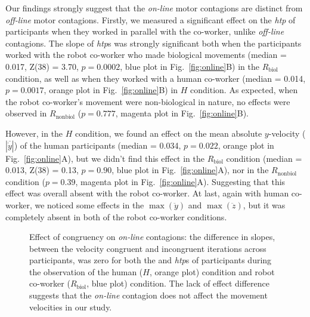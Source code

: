 Our findings strongly suggest that the \textit{on-line} motor contagions are distinct from \textit{off-line} motor contagions. Firstly, we measured a significant effect on the {\it htp} of participants when they worked in parallel with the co-worker, unlike \textit{off-line} contagions. The slope of {\it htp}s was strongly significant both when the participants worked with the robot co-worker who made biological movements (median = 0.017, Z(38) = 3.70, $p = 0.0002$, blue plot in Fig.~\ref{fig:online}B) in the $R_{\text{biol}}$ condition, as well as when they worked with a human co-worker (median = 0.014, $p = 0.0017$, orange plot in Fig.~\ref{fig:online}B) in $H$ condition. As expected, when the robot co-worker's movement were non-biological in nature, no effects were observed in $R_{\text{nonbiol}}$ ($p = 0.777$, magenta plot in Fig.~\ref{fig:online}B).
 
However, in the $H$ condition, we found an effect on the mean absolute $y$-velocity ($|\overline{\dot{y}}|$) of the human participants (median = 0.034, $p = 0.022$, orange plot in Fig.~\ref{fig:online}A), but we didn't find this effect in the $R_{\text{biol}}$ condition (median = 0.013, Z(38) = 0.13, $p = 0.90$, blue plot in Fig.~\ref{fig:online}A), nor in the $R_{\text{nonbiol}}$ condition ($p = 0.39$, magenta plot in Fig.~\ref{fig:online}A). Suggesting that this effect was overall absent with the robot co-worker. At last, again with human co-worker, we noticed some effects in the $\max(\ddot{y})$ and $\max(\ddot{z})$, but it was completely absent in both of the robot co-worker conditions.


\begin{figure}[t]
	\caption{Effect of congruency on \textit{on-line} contagions: the difference in slopes, between the velocity congruent and incongruent iterations across participants, was zero for both the  and \textit{htp}s of participants during the observation of the human ($\textit{H}$, orange plot) condition and robot co-worker ($\textit{R}_{\text{biol}}$, blue plot) condition. The lack of effect difference suggests that the \textit{on-line} contagion does not affect the movement velocities in our study.}
	\label{fig:cong}
\end{figure}

